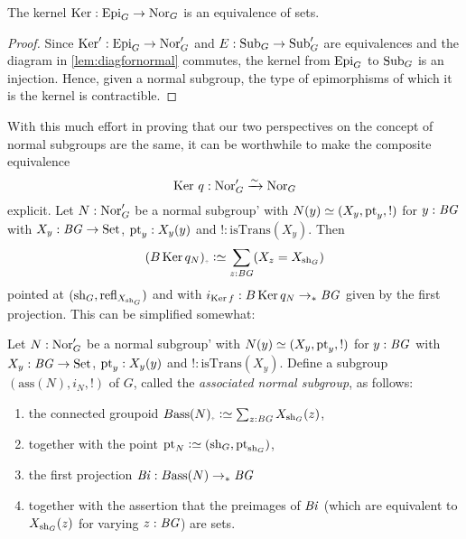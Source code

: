 \begin{corollary}
  \label{cor:normalisnormal}
  The kernel $\ker:\typeepi_G\to \typenormal_G$ is an equivalence of sets.
\end{corollary}
\begin{proof}
  Since $\ker':\typeepi_G\to\typenormal_G'$ and $E:\mathrm{Sub}_G\to\mathrm{Sub}_G'$ are equivalences and the diagram in \cref{lem:diagfornormal} commutes, the kernel from $\mathrm{Epi}_G$ to $\mathrm{Sub}_G$ is an injection.  Hence, given a normal subgroup, the type of epimorphisms of which it is the kernel is contractible.
\end{proof}

With this much effort in proving that our two perspectives on the concept of normal subgroups are the same, it can be worthwhile to make the composite equivalence
$$\ker\,q:\typenormal_G'\we\typenormal_G$$
explicit.   Let $N:\mathrm{Nor}'_G$ be a normal subgroup' with $N(y)\oldequiv (X_y,\pt_y,!)$ for $y:\mathit{B}\mathit{G}$ with $X_y:\mathit{B}\mathit{G}\to\mathrm{Set}$, $\mathrm{pt}_y:X_y(y)$ and $!:\mathrm{isTrans}(X_y)$. 
Then 
$$(B\ker q_N)_\div\defequi\sum_{z:\BG}(X_z=X_{\sh_G})$$
pointed at $(\mathrm{sh}_G,\mathrm{refl}_{X_{\mathrm{sh}_G}})$ and with $i_{\ker f}:B\ker q_N\to_*\BG$ given by the first projection.  This can be simplified somewhat:

\begin{definition}
  \label{def:associatednormal}
  Let $N:\mathrm{Nor}'_G$ be a normal subgroup' with $N(y)\oldequiv (X_y,\pt_y,!)$ for $y:\mathit{B}\mathit{G}$ with $X_y:\mathit{B}\mathit{G}\to\mathrm{Set}$, $\mathrm{pt}_y:X_y(y)$ and $!:\mathrm{isTrans}(X_y)$.  Define a subgroup $(\mathrm{ass}(N),i_N,!)$ of $G$, called the \emph{associated normal subgroup}, as follows:
  \begin{enumerate}
  \item the connected groupoid $B\mathrm{ass}(N)_\div\defequi\sum_{z:\BG}X_{\sh_G}(z)$,
  \item together with the point $\pt_N\defequi(\sh_G,\pt_{\sh_G})$,
  \item the first projection $\mathit{B}\mathit{i}:B\mathrm{ass}(N)\to_*\mathit{B}\mathit{G}$
  \item together with the assertion that the preimages of $\mathit{B}\mathit{i}$ (which are equivalent to $X_{\mathrm{sh}_G}(z)$ for varying $z:\mathit{B}\mathit{G}$) are sets. 
  \end{enumerate}
\end{definition}


